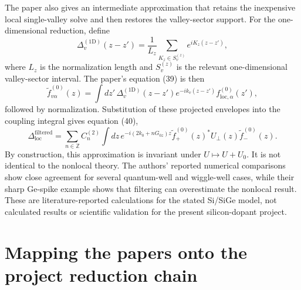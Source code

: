 The paper also gives an intermediate approximation that retains the inexpensive
local single-valley solve and then restores the valley-sector support. For the
one-dimensional reduction, define
\begin{equation}
  \Delta_v^{(1\mathrm D)}(z-z')
  =
  \frac{1}{L_z}\sum_{K_z\in S_v^{(z)}}e^{iK_z(z-z')},
  \label{eq:ermoneit-one-dimensional-projector}
\end{equation}
where $L_z$ is the normalization length and $S_v^{(z)}$ is the relevant
one-dimensional valley-sector interval. The paper's equation (39) is then
\begin{equation}
  \widetilde f_{v\alpha}^{(0)}(z)
  =
  \int dz'\,
  \Delta_v^{(1\mathrm D)}(z-z')e^{-ik_v(z-z')}
  f_{\mathrm{loc},\alpha}^{(0)}(z'),
  \label{eq:ermoneit-filtered-envelope}
\end{equation}
followed by normalization. Substitution of these projected envelopes into the
coupling integral gives equation (40),
\begin{equation}
  \Delta_{\mathrm{loc}}^{\mathrm{filtered}}
  =
  \sum_{n\in\mathbb Z}C_n^{(2)}
  \int dz\,
  e^{-i(2k_0+nG_{0z})z}
  \widetilde f_{+}^{(0)}(z)^{*}U_{\perp}(z)
  \widetilde f_{-}^{(0)}(z).
  \label{eq:ermoneit-filtered-coupling}
\end{equation}
By construction, this approximation is invariant under $U\mapsto U+U_0$.
It is not identical to the nonlocal theory. The authors' reported numerical
comparisons show close agreement for several quantum-well and wiggle-well cases,
while their sharp Ge-spike example shows that filtering can overestimate the
nonlocal result. These are literature-reported calculations for the stated
Si/SiGe model, not calculated results or scientific validation for the present
silicon-dopant project.

\section{Mapping the papers onto the project reduction chain}

